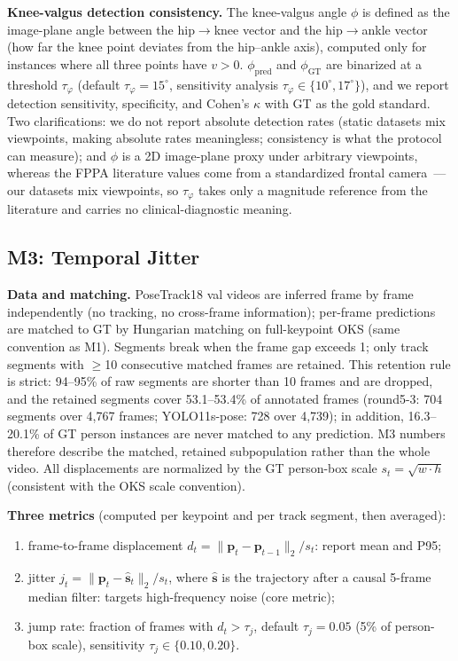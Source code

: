 \documentclass[10pt,conference]{IEEEtran}
\begin{document}
\textbf{Knee-valgus detection consistency.} The knee-valgus angle $\phi$ is defined as the image-plane angle between the hip$\rightarrow$knee vector and the hip$\rightarrow$ankle vector (how far the knee point deviates from the hip--ankle axis), computed only for instances where all three points have $v>0$. $\phi_{\mathrm{pred}}$ and $\phi_{\mathrm{GT}}$ are binarized at a threshold $\tau_\varphi$ (default $\tau_\varphi=15^{\circ}$, sensitivity analysis $\tau_\varphi\in\{10^{\circ},17^{\circ}\}$), and we report detection sensitivity, specificity, and Cohen's $\kappa$ with GT as the gold standard. Two clarifications: we do not report absolute detection rates (static datasets mix viewpoints, making absolute rates meaningless; consistency is what the protocol can measure); and $\phi$ is a 2D image-plane proxy under arbitrary viewpoints, whereas the FPPA literature values come from a standardized frontal camera~\cite{11}---our datasets mix viewpoints, so $\tau_\varphi$ takes only a magnitude reference from the literature and carries no clinical-diagnostic meaning.

\subsection{M3: Temporal Jitter}

\textbf{Data and matching.} PoseTrack18 val videos are inferred frame by frame independently (no tracking, no cross-frame information); per-frame predictions are matched to GT by Hungarian matching on full-keypoint OKS (same convention as M1). Segments break when the frame gap exceeds 1; only track segments with $\ge$10 consecutive matched frames are retained. This retention rule is strict: 94--95\% of raw segments are shorter than 10 frames and are dropped, and the retained segments cover 53.1--53.4\% of annotated frames (round5-3: 704 segments over 4,767 frames; YOLO11s-pose: 728 over 4,739); in addition, 16.3--20.1\% of GT person instances are never matched to any prediction. M3 numbers therefore describe the matched, retained subpopulation rather than the whole video. All displacements are normalized by the GT person-box scale $s_t=\sqrt{w\cdot h}$ (consistent with the OKS scale convention).

\textbf{Three metrics} (computed per keypoint and per track segment, then averaged):

\begin{enumerate}
\item frame-to-frame displacement $d_t=\lVert\mathbf{p}_t-\mathbf{p}_{t-1}\rVert_2/s_t$: report mean and P95;
\item jitter $j_t=\lVert\mathbf{p}_t-\hat{\mathbf{s}}_t\rVert_2/s_t$, where $\hat{\mathbf{s}}$ is the trajectory after a causal 5-frame median filter: targets high-frequency noise (core metric);
\item jump rate: fraction of frames with $d_t>\tau_j$, default $\tau_j=0.05$ (5\% of person-box scale), sensitivity $\tau_j\in\{0.10,0.20\}$.
\end{enumerate}
\end{document}
